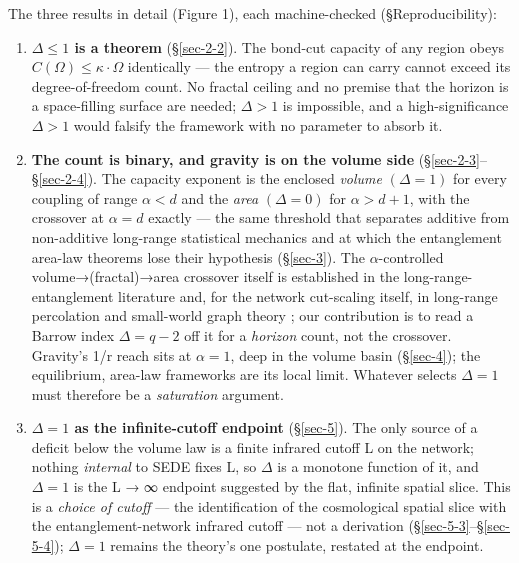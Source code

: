 \documentclass[aps,prd,preprint,nofootinbib,superscriptaddress]{revtex4-2}
\providecommand{\tightlist}{\setlength{\itemsep}{0pt}\setlength{\parskip}{0pt}}
\begin{document}
The three results in detail (Figure 1), each machine-checked
(§Reproducibility):

\begin{enumerate}
\def\labelenumi{\arabic{enumi}.}
\tightlist
\item
  \textbf{\(\Delta  \leq  1\) is a theorem} (§\ref{sec-2-2}). The
  bond-cut capacity of any region obeys
  \(C(\Omega ) \leq  \kappa \cdot\)\textbar{}\(\Omega\)\textbar{}
  identically --- the entropy a region can carry cannot exceed its
  degree-of-freedom count. No fractal ceiling and no premise that the
  horizon is a space-filling surface are needed; \(\Delta  > 1\) is
  impossible, and a high-significance \(\Delta  > 1\) would falsify the
  framework with no parameter to absorb it.
\item
  \textbf{The count is binary, and gravity is on the volume side}
  (§\ref{sec-2-3}--§\ref{sec-2-4}). The capacity exponent is the
  enclosed \emph{volume} \((\Delta  = 1)\) for every coupling of range
  \(\alpha  < d\) and the \emph{area} \((\Delta  = 0)\) for
  \(\alpha  > d+1\), with the crossover at \(\alpha  = d\) exactly ---
  the same threshold that separates additive from non-additive
  long-range statistical mechanics and at which the entanglement
  area-law theorems \citep{Eisert:2008ur} lose their hypothesis
  (§\ref{sec-3}). The \(\alpha\)-controlled volume→(fractal)→area
  crossover itself is established in the long-range-entanglement
  literature
  \citep{Vitagliano:2010db, Solfanelli:2023vav, Chakraborty:2023mrw}
  and, for the network cut-scaling itself, in long-range percolation and
  small-world graph theory
  \citep{BenjaminiBerger:2001, Biskup:2004, Kleinberg:2000}; our
  contribution is to read a Barrow index \(\Delta  = q - 2\) off it for
  a \emph{horizon} count, not the crossover. Gravity's 1/r reach sits at
  \(\alpha  = 1\), deep in the volume basin (§\ref{sec-4}); the
  equilibrium, area-law frameworks are its local limit. Whatever selects
  \(\Delta  = 1\) must therefore be a \emph{saturation} argument.
\item
  \textbf{\(\Delta  = 1\) as the infinite-cutoff endpoint}
  (§\ref{sec-5}). The only source of a deficit below the volume law is a
  finite infrared cutoff L on the network; nothing \emph{internal} to
  SEDE fixes L, so \(\Delta\) is a monotone function of it, and
  \(\Delta  = 1\) is the L → ∞ endpoint suggested by the flat, infinite
  spatial slice. This is a \emph{choice of cutoff} --- the
  identification of the cosmological spatial slice with the
  entanglement-network infrared cutoff --- not a derivation
  (§\ref{sec-5-3}--§\ref{sec-5-4}); \(\Delta  = 1\) remains the theory's
  one postulate, restated at the endpoint.
\end{enumerate}
\end{document}
